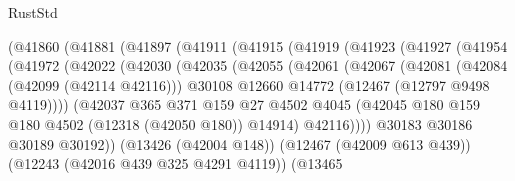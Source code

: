 \begin{lexlean}{RustStd}
\begin{coremodule}
                        (@41860
                          (@41881
                            (@41897
                              (@41911
                                (@41915
                                  (@41919
                                    (@41923
                                      (@41927
                                        (@41954
                                          (@41972
                                            (@42022
                                              (@42030
                                                (@42035
                                                  (@42055
                                                    (@42061
                                                      (@42067
                                                        (@42081
                                                          (@42084 (@42099 (@42114 @42116)))
                                                          @30108
                                                          @12660
                                                          @14772
                                                          (@12467 (@12797 @9498 @4119))))
                                                      (@42037
                                                        @365
                                                        @371
                                                        @159
                                                        @27
                                                        @4502
                                                        @4045
                                                        (@42045
                                                          @180
                                                          @159
                                                          @180
                                                          @4502
                                                          (@12318 (@42050 @180))
                                                          @14914)
                                                        @42116))))
                                                @30183
                                                @30186
                                                @30189
                                                @30192))
                                            (@13426 (@42004 @148))
                                            (@12467 (@42009 @613 @439))
                                            (@12243 (@42016 @439 @325 @4291 @4119))
                                            (@13465

\end{coremodule}
\end{lexlean}
